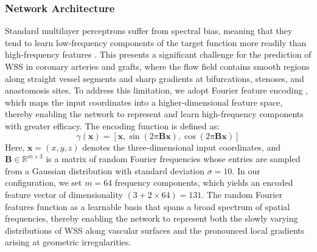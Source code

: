 ﻿\documentclass[12pt,a4paper]{article}
\theoremstyle{definition}
\numberwithin{equation}{section}
\begin{document}
{{\subsubsection{Network Architecture}}
Standard multilayer perceptrons suffer from spectral bias, meaning that they tend to learn low-frequency components of the target function more readily than high-frequency features \cite{89}. This presents a significant challenge for the prediction of WSS in coronary arteries and grafts, where the flow field contains smooth regions along straight vessel segments and sharp gradients at bifurcations, stenoses, and anastomosis sites. To address this limitation, we adopt Fourier feature encoding \cite{90}, which maps the input coordinates into a higher-dimensional feature space, thereby enabling the network to represent and learn high-frequency components with greater efficacy. The encoding function is defined as:
\begin{equation}
    \gamma(\mathbf{x}) = \left[ \mathbf{x}, \sin(2\pi \mathbf{B} \mathbf{x}), \cos(2\pi \mathbf{B} \mathbf{x}) \right]
\end{equation}
Here, $\mathbf{x} = (x, y, z)$ denotes the three-dimensional input coordinates, and $\mathbf{B} \in \mathbb{R}^{m \times 3}$ is a matrix of random Fourier frequencies whose entries are sampled from a Gaussian distribution with standard deviation $\sigma = 10$. In our configuration, we set $m = 64$ frequency components, which yields an encoded feature vector of dimensionality $(3 + 2 \times 64) = 131$. The random Fourier features function as a learnable basis that spans a broad spectrum of spatial frequencies, thereby enabling the network to represent both the slowly varying distributions of WSS along vascular surfaces and the pronounced local gradients arising at geometric irregularities.

}
\end{document}

